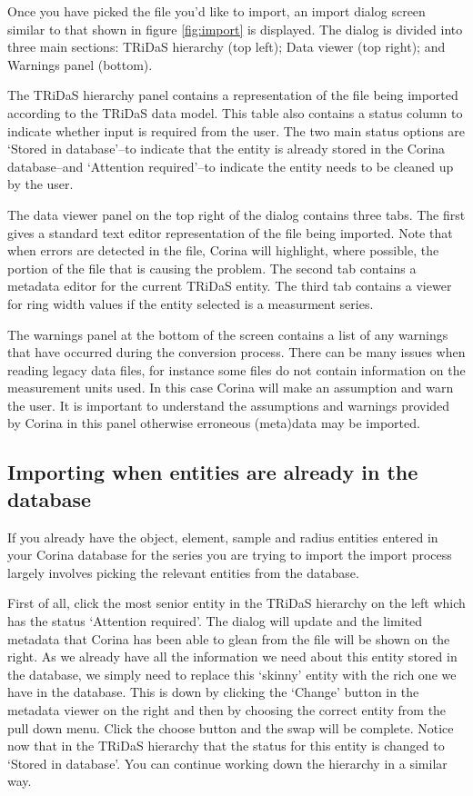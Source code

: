 Once you have picked the file you'd like to import, an import dialog screen similar to that shown in figure \ref{fig:import} is displayed. The dialog is divided into three main sections: TRiDaS hierarchy (top left); Data viewer (top right); and Warnings panel (bottom).   

The TRiDaS hierarchy panel contains a representation of the file being imported according to the TRiDaS data model.  This table also contains a status column to indicate whether input is required from the user.  The two main status options are `Stored in database'--to indicate that the entity is already stored in the Corina database--and `Attention required'--to indicate the entity needs to be cleaned up by the user.  

The data viewer panel on the top right of the dialog contains three tabs.  The first gives a standard text editor representation of the file being imported.  Note that when errors are detected in the file, Corina will highlight, where possible, the portion of the file that is causing the problem.  The second tab contains a metadata editor for the current TRiDaS entity.  The third tab contains a viewer for ring width values if the entity selected is a measurment series.

The warnings panel at the bottom of the screen contains a list of any warnings that have occurred during the conversion process.  There can be many issues when reading legacy data files, for instance some files do not contain information on the measurement units used.  In this case Corina will make an assumption and warn the user.  It is important to understand the assumptions and warnings provided by Corina in this panel otherwise erroneous (meta)data may be imported.

\subsection{Importing when entities are already in the database}
If you already have the object, element, sample and radius entities entered in your Corina database for the series you are trying to import the import process largely involves picking the relevant entities from the database.  

First of all, click the most senior entity in the TRiDaS hierarchy on the left which has the status `Attention required'.  The dialog will update and the limited metadata that Corina has been able to glean from the file will be shown on the right.  As we already have all the information we need about this entity stored in the database, we simply need to replace this `skinny' entity with the rich one we have in the database.  This is down by clicking the `Change' button in the metadata viewer on the right and then by choosing the correct entity from the pull down menu.  Click the choose button and the swap will be complete.  Notice now that in the TRiDaS hierarchy that the status for this entity is changed to `Stored in database'.  You can continue working down the hierarchy in a similar way.

